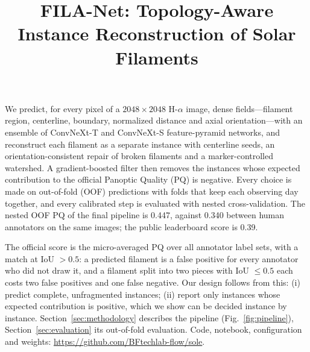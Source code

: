 %
%

\title{FILA-Net: Topology-Aware Instance Reconstruction of Solar Filaments}

We predict, for every pixel of a $2048\times2048$ H-$\alpha$ image, dense
fields---filament region, centerline, boundary, normalized distance and axial
orientation---with an ensemble of ConvNeXt-T and ConvNeXt-S feature-pyramid
networks, and reconstruct each filament as a separate instance with
centerline seeds, an orientation-consistent repair of broken filaments and a
marker-controlled watershed. A gradient-boosted filter then removes the
instances whose expected contribution to the official Panoptic Quality (PQ)
is negative. Every choice is made on out-of-fold (OOF) predictions with folds
that keep each observing day together, and every calibrated step is
evaluated with nested cross-validation. The nested OOF PQ of the final
pipeline is 0.447, against 0.340 between human annotators on the same
images; the public leaderboard score is 0.39.

The official score is the micro-averaged PQ over all annotator label sets,
with a match at IoU $>0.5$: a predicted filament is a false positive for every
annotator who did not draw it, and a filament split into two pieces with
IoU $\le0.5$ each costs two false positives and one false negative. Our
design follows from this: (i) predict complete, unfragmented instances;
(ii) report only instances whose expected contribution is positive, which
we show can be decided instance by instance. Section~\ref{sec:methodology}
describes the pipeline (Fig.~\ref{fig:pipeline}), Section~\ref{sec:evaluation}
its out-of-fold evaluation. Code, notebook, configuration and weights:
\url{https://github.com/BFtechlab-flow/sole}.

